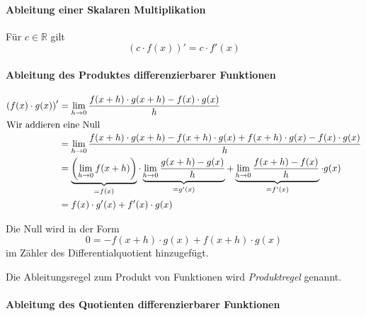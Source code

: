 \paragraph{Ableitung einer Skalaren Multiplikation}
Für $c\in \mathbb{R}$ gilt
\begin{equation}\label{eq:diff1}
\left(c\cdot f(x)\right)' = c \cdot f'(x)
\end{equation}

\paragraph{Ableitung des Produktes differenzierbarer Funktionen}
\begin{equation}
\begin{split}\label{eq:diff2}
\left(f(x) \cdot g(x) \right)' &= \lim\limits_{h\rightarrow 0} \frac{f(x+h)\cdot g(x+h)-f(x)\cdot g(x)}{h} \\
\intertext{Wir addieren eine Null}
&= \lim\limits_{h\rightarrow 0} \frac{f(x+h)\cdot g(x+h) -f(x+h)\cdot g(x)+f(x+h)\cdot g(x) - f(x)\cdot g(x)}{h} \\
&= \underbrace{\left( \lim\limits_{h\rightarrow 0}f(x+h)\right)}_{=f(x)} \cdot 
\underbrace{\lim\limits_{h\rightarrow 0} \frac{g(x+h)-g(x)}{h}}_{=g'(x)} +\underbrace{\lim\limits_{h\rightarrow 0} \frac{f(x+h)-f(x)}{h}}_{=f'(x)} \cdot g(x)\\
&= f(x)\cdot g'(x) + f'(x)\cdot g(x)
\end{split}
\end{equation}

\noindent Die Null wird in der Form
\begin{equation*}
0 = -f(x+h)\cdot g(x)+f(x+h)\cdot g(x)
\end{equation*}
im Zähler des Differentialquotient hinzugefügt.

\begin{definition}
Die Ableitungsregel zum Produkt von Funktionen wird \emph{Produktregel} genannt.
\end{definition}

\paragraph{Ableitung des Quotienten differenzierbarer Funktionen}


